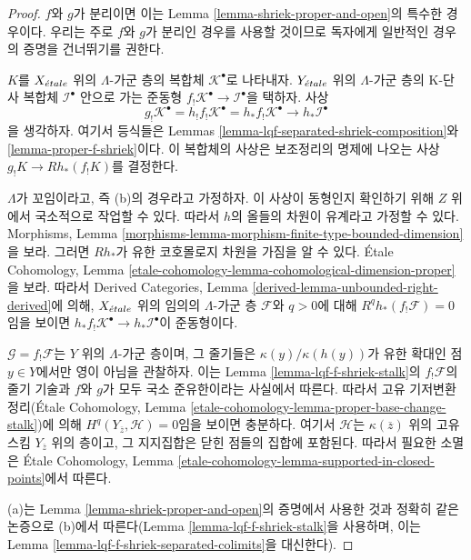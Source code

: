 \begin{proof}
$f$와 $g$가 분리이면 이는 Lemma
\ref{lemma-shriek-proper-and-open}의 특수한 경우이다. 우리는 주로
$f$와 $g$가 분리인 경우를 사용할 것이므로 독자에게 일반적인 경우의
증명을 건너뛰기를 권한다.

\medskip\noindent
$K$를 $X_{\acute{e}tale}$ 위의 $\Lambda$-가군 층의 복합체
$\mathcal{K}^\bullet$로 나타내자. $Y_{\acute{e}tale}$ 위의 $\Lambda$-가군 층의
K-단사 복합체 $\mathcal{I}^\bullet$ 안으로 가는 준동형
$f_!\mathcal{K}^\bullet \to \mathcal{I}^\bullet$을 택하자. 사상
$$
g_!\mathcal{K}^\bullet =
h_!f_!\mathcal{K}^\bullet =
h_*f_!\mathcal{K}^\bullet
\longrightarrow
h_*\mathcal{I}^\bullet
$$
을 생각하자. 여기서 등식들은 Lemmas
\ref{lemma-lqf-separated-shriek-composition}와
\ref{lemma-proper-f-shriek}이다. 이 복합체의 사상은 보조정리의 명제에
나오는 사상 $g_!K \to Rh_*(f_!K)$를 결정한다.

\medskip\noindent
$\Lambda$가 꼬임이라고, 즉 (b)의 경우라고 가정하자. 이 사상이
동형인지 확인하기 위해 $Z$ 위에서 국소적으로 작업할 수 있다. 따라서
$h$의 올들의 차원이 유계라고 가정할 수 있다. Morphisms, Lemma
\ref{morphisms-lemma-morphism-finite-type-bounded-dimension}을 보라.
그러면 $Rh_*$가 유한 코호몰로지 차원을 가짐을 알 수 있다.
\'Etale Cohomology, Lemma
\ref{etale-cohomology-lemma-cohomological-dimension-proper}을 보라.
따라서 Derived Categories, Lemma
\ref{derived-lemma-unbounded-right-derived}에 의해, $X_{\acute{e}tale}$ 위의
임의의 $\Lambda$-가군 층 $\mathcal{F}$와 $q > 0$에 대해
$R^qh_*(f_!\mathcal{F}) = 0$임을 보이면
$h_*f_!\mathcal{K}^\bullet \to h_*\mathcal{I}^\bullet$이 준동형이다.

\medskip\noindent
$\mathcal{G} = f_!\mathcal{F}$는 $Y$ 위의 $\Lambda$-가군 층이며,
그 줄기들은 $\kappa(y)/\kappa(h(y))$가 유한 확대인 점 $y \in Y$에서만
영이 아님을 관찰하자. 이는 Lemma
\ref{lemma-lqf-f-shriek-stalk}의 $f_!\mathcal{F}$의 줄기 기술과
$f$와 $g$가 모두 국소 준유한이라는 사실에서 따른다. 따라서 고유
기저변환 정리(\'Etale Cohomology, Lemma
\ref{etale-cohomology-lemma-proper-base-change-stalk})에 의해
$H^q(Y_{\overline{z}}, \mathcal{H}) = 0$임을 보이면 충분하다.
여기서 $\mathcal{H}$는 $\kappa(\overline{z})$ 위의 고유 스킴
$Y_{\overline{z}}$ 위의 층이고, 그 지지집합은 닫힌 점들의 집합에
포함된다.
따라서 필요한 소멸은 \'Etale Cohomology, Lemma
\ref{etale-cohomology-lemma-supported-in-closed-points}에서 따른다.

\medskip\noindent
(a)는 Lemma \ref{lemma-shriek-proper-and-open}의 증명에서 사용한 것과
정확히 같은 논증으로 (b)에서 따른다(Lemma
\ref{lemma-lqf-f-shriek-stalk}을 사용하며, 이는 Lemma
\ref{lemma-lqf-f-shriek-separated-colimits}을 대신한다).
\end{proof}


